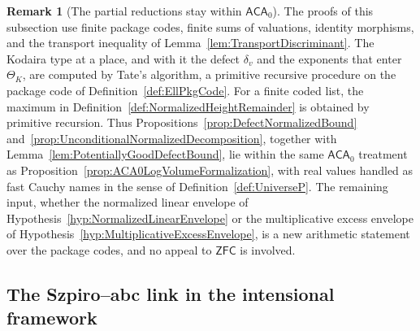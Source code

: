 \documentclass[10pt, reqno]{amsart}
\theoremstyle{plain}
\theoremstyle{definition}
\newtheorem{remark}[theorem]{Remark}
\theoremstyle{plain}
\begin{document}
\begin{remark}[The partial reductions stay within \texorpdfstring{\(\mathsf{ACA}_{0}\)}{ACA0}]
\label{rem:PartialProfileACA0}
The proofs of this subsection use finite package codes, finite sums of valuations, identity morphisms, and the transport inequality of Lemma~\ref{lem:TransportDiscriminant}. The Kodaira type at a place, and with it the defect $\delta_{v}$ and the exponents that enter $\Theta_{K}$, are computed by Tate's algorithm, a primitive recursive procedure on the package code of Definition~\ref{def:EllPkgCode}. For a finite coded list, the maximum in Definition~\ref{def:NormalizedHeightRemainder} is obtained by primitive recursion. Thus Propositions~\ref{prop:DefectNormalizedBound} and~\ref{prop:UnconditionalNormalizedDecomposition}, together with Lemma~\ref{lem:PotentiallyGoodDefectBound}, lie within the same $\mathsf{ACA}_{0}$ treatment as Proposition~\ref{prop:ACA0LogVolumeFormalization}, with real values handled as fast Cauchy names in the sense of Definition~\ref{def:UniverseP}. The remaining input, whether the normalized linear envelope of Hypothesis~\ref{hyp:NormalizedLinearEnvelope} or the multiplicative excess envelope of Hypothesis~\ref{hyp:MultiplicativeExcessEnvelope}, is a new arithmetic statement over the package codes, and no appeal to $\mathsf{ZFC}$ is involved.
\end{remark}

\subsection{The Szpiro--abc link in the intensional framework}\label{subsec:SzpiroAbc}
\end{document}

